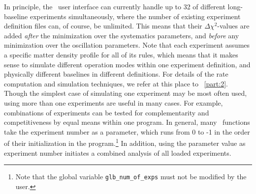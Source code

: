 In principle, the \GLOBES\ user interface can currently handle up to 32 of different long-baseline experiments simultaneously, where the number
of existing experiment definition files can, of course, be unlimited. This means that their $\Delta \chi^2$-values are added {\em after} the minimization over the systematics parameters, and {\em before} any minimization over the oscillation parameters. Note that each experiment
assumes a specific matter density profile for all of its rules, which means
that it makes sense to simulate different operation modes within one
experiment definition, and physically different baselines in different
definitions. For details of the rate computation and
simulation techniques, we refer at this place to \Part~\ref{part:2}. Though
 the simplest case of simulating one experiment may be most often used, 
 using more than one experiments are useful in many cases. For example, combinations of experiments can be tested for
complementarity and competitiveness by equal means within one program.
In general, many \GLOBES\ functions take the experiment number as
a parameter, which runs from $0$ to -1 in the order of their initialization in the program.\footnote{Note that
the global variable {\tt glb\_num\_of\_exps} must not be modified by the
user.} In addition, using the parameter value  as
experiment number initiates a combined analysis of all loaded experiments.
 
